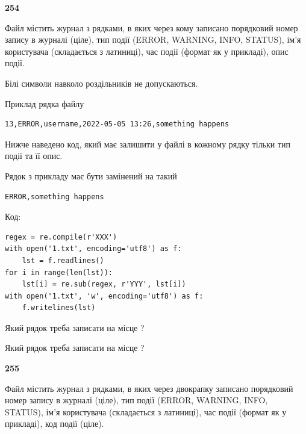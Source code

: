 \newpage

{\begin {center}\textbf{ 254}\end {center}}\par
Файл  містить журнал з рядками, в яких через кому записано поряд\-ко\-вий номер запису в журналі (ціле), тип події (ERROR, WARNING, INFO, STATUS), ім'я користувача (складається з латиниці), час події (фор\-мат як у прикладі), опис події.

Білі символи навколо роздільників не допускаються.

Приклад рядка файлу



\begin{verbatim}
13,ERROR,username,2022-05-05 13:26,something happens
\end{verbatim}


Нижче наведено код, який має залишити у файлі в кожному рядку тільки тип події та її опис.

Рядок з прикладу має бути замінений на такий



\begin{verbatim}
ERROR,something happens
\end{verbatim}




Код:



\begin{verbatim}
regex = re.compile(r'XXX')
with open('1.txt', encoding='utf8') as f:
    lst = f.readlines()
for i in range(len(lst)):
    lst[i] = re.sub(regex, r'YYY', lst[i])
with open('1.txt', 'w', encoding='utf8') as f:
    f.writelines(lst)
\end{verbatim}









Який рядок треба записати на місце  ?\par
\vspace{5mm}


Який рядок треба записати на місце  ?\par


\newpage

{\begin {center}\textbf{ 255}\end {center}}\par
Файл  містить журнал з рядками, в яких через двокрапку записано поряд\-ко\-вий номер запису в журналі (ціле), тип події (ERROR, WARNING, INFO, STATUS), ім'я користувача (складається з латиниці), час події (фор\-мат як у прикладі), код події (ціле).

